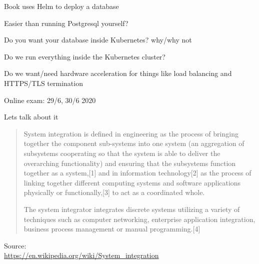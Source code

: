 \documentclass[Screen16to9,17pt]{foils}
\begin{document}


\begin{quote}

\end{quote}

\begin{list2}
  \item Book uses Helm to deploy a database
  \item Easier than running Postgresql yourself?
  \item Do you want your database inside Kubernetes? why/why not
\end{list2}



\begin{quote}

\end{quote}

\begin{list2}
  \item Do we run everything inside the Kubernetes cluster?
  \item Do we want/need hardware acceleration for things like load balancing and HTTPS/TLS termination
\end{list2}



Online exam: 29/6, 30/6 2020

Lets talk about it



\begin{quote}
  System integration is defined in engineering as the process of bringing together the component sub-systems into one system (an aggregation of subsystems cooperating so that the system is able to deliver the overarching functionality) and ensuring that the subsystems function together as a system,[1] and in information technology[2] as the process of linking together different computing systems and software applications physically or functionally,[3] to act as a coordinated whole.

  The system integrator integrates discrete systems utilizing a variety of techniques such as computer networking, enterprise application integration, business process management or manual programming.[4]
\end{quote}

Source:\\
\url{https://en.wikipedia.org/wiki/System_integration}
\end{document}
